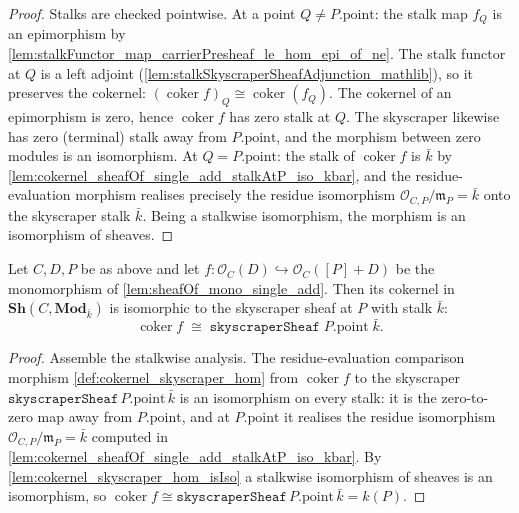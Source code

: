 \begin{proof}
        \leanok
  Stalks are checked pointwise. At a point \(Q \neq P.\mathrm{point}\): the stalk
  map \(f_Q\) is an epimorphism by
  \cref{lem:stalkFunctor_map_carrierPresheaf_le_hom_epi_of_ne}. The stalk functor
  at \(Q\) is a left adjoint
  (\cref{lem:stalkSkyscraperSheafAdjunction_mathlib}), so it preserves the
  cokernel: \((\operatorname{coker} f)_Q \cong
  \operatorname{coker}(f_Q)\). The cokernel of an epimorphism is
  zero, hence \(\operatorname{coker} f\) has zero stalk at \(Q\). The skyscraper
  likewise has zero (terminal) stalk away from \(P.\mathrm{point}\), and the
  morphism between zero modules is an isomorphism. At \(Q = P.\mathrm{point}\): the stalk of \(\operatorname{coker}
  f\) is \(\bar k\) by
  \cref{lem:cokernel_sheafOf_single_add_stalkAtP_iso_kbar}, and the
  residue-evaluation morphism realises precisely the residue isomorphism
  \(\mathcal O_{C,P}/\mathfrak m_P = \bar k\) onto the skyscraper stalk
  \(\bar k\). Being a stalkwise isomorphism, the morphism is an isomorphism of
  sheaves.
\end{proof}

\begin{lemma}

  \label{lem:cokernel_sheafOf_single_add_iso_skyscraper}
  Let \(C, D, P\) be as above and let
  \(f : \mathcal O_C(D) \hookrightarrow \mathcal O_C([P]+D)\) be the
  monomorphism of \cref{lem:sheafOf_mono_single_add}. Then its cokernel in
  \(\mathbf{Sh}(C, \mathbf{Mod}_{\bar k})\) is isomorphic to the skyscraper
  sheaf at \(P\) with stalk \(\bar k\):
  \[
    \operatorname{coker} f \;\cong\;
    \texttt{skyscraperSheaf}\;P.\mathrm{point}\;\bar k.
  \]
\end{lemma}

\begin{proof}
        \leanok
  Assemble the stalkwise analysis. The residue-evaluation comparison morphism
  \cref{def:cokernel_skyscraper_hom} from \(\operatorname{coker} f\) to the
  skyscraper \(\texttt{skyscraperSheaf}\,P.\mathrm{point}\,\bar k\) is an
  isomorphism on every stalk: it is the zero-to-zero map away from
  \(P.\mathrm{point}\), and at \(P.\mathrm{point}\) it realises the residue
  isomorphism \(\mathcal O_{C,P}/\mathfrak m_P = \bar k\) computed in
  \cref{lem:cokernel_sheafOf_single_add_stalkAtP_iso_kbar}. By
  \cref{lem:cokernel_skyscraper_hom_isIso} a stalkwise isomorphism of sheaves is
  an isomorphism, so \(\operatorname{coker} f \cong
  \texttt{skyscraperSheaf}\,P.\mathrm{point}\,\bar k = k(P)\).
\end{proof}


